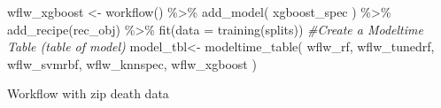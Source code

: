 \documentclass[
]{article}
\newenvironment{Shaded}{\begin{snugshade}}{\end{snugshade}}
\newcommand{\AttributeTok}[1]{\textcolor[rgb]{0.77,0.63,0.00}{#1}}
\newcommand{\CommentTok}[1]{\textcolor[rgb]{0.56,0.35,0.01}{\textit{#1}}}
\newcommand{\FunctionTok}[1]{\textcolor[rgb]{0.00,0.00,0.00}{#1}}
\newcommand{\NormalTok}[1]{#1}
\newcommand{\OtherTok}[1]{\textcolor[rgb]{0.56,0.35,0.01}{#1}}
\newcommand{\SpecialCharTok}[1]{\textcolor[rgb]{0.00,0.00,0.00}{#1}}
\begin{document}
\begin{Shaded}
\begin{Highlighting}[]
\NormalTok{wflw\_xgboost }\OtherTok{\textless{}{-}} \FunctionTok{workflow}\NormalTok{() }\SpecialCharTok{\%\textgreater{}\%}
    \FunctionTok{add\_model}\NormalTok{(}
\NormalTok{        xgboost\_spec}
\NormalTok{    ) }\SpecialCharTok{\%\textgreater{}\%}
    \FunctionTok{add\_recipe}\NormalTok{(rec\_obj) }\SpecialCharTok{\%\textgreater{}\%}
    \FunctionTok{fit}\NormalTok{(}\AttributeTok{data =} \FunctionTok{training}\NormalTok{(splits))  }
\CommentTok{\#Create a Modeltime Table (table of model)}
\NormalTok{model\_tbl}\OtherTok{\textless{}{-}} \FunctionTok{modeltime\_table}\NormalTok{(}
\NormalTok{    wflw\_rf,}
\NormalTok{    wflw\_tunedrf,}
\NormalTok{    wflw\_svmrbf,}
\NormalTok{    wflw\_knnspec,}
\NormalTok{    wflw\_xgboost}
\NormalTok{)}
\end{Highlighting}
\end{Shaded}

Workflow with zip death data
\end{document}
